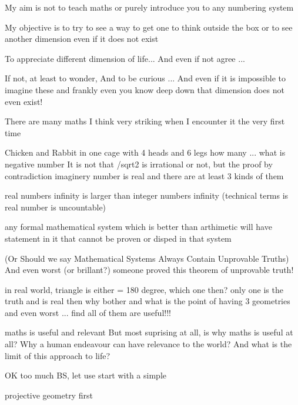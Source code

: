 \documentclass[letterpaper,10pt,english]{jupyterBook}
\begin{document}
\begin{sphinxVerbatim}[commandchars=\\\{\}]
My aim is not to \PYGZdq{}teach\PYGZdq{} maths 
    or purely introduce you to any numbering system
    
My objective is to 
    try to see a way to get one to think outside the box
    or to see another dimension even if it does not exist

To appreciate different dimension of life...
       And even if not agree ... 

If not, at least to wonder, 
       And to be curious ...
            And even if it is impossible to imagine these
                and frankly even you know deep down that dimension does not even exist!
\end{sphinxVerbatim}

\begin{sphinxVerbatim}[commandchars=\\\{\}]
There are many maths I think very striking when I encounter it the very first time

\PYGZhy{} Chicken and Rabbit in one cage with 4 heads and 6 legs how many ...
\PYGZhy{} what is negative number
\PYGZhy{} It is not that /sqrt\PYGZob{}2\PYGZcb{} is irrational or not, but the proof by contradiction
\PYGZhy{} imaginery number is real and there are at least 3 kinds of them

\PYGZhy{}\PYGZhy{}\PYGZhy{}\PYGZgt{} real number\PYGZsq{}s infinity is larger than integer number\PYGZsq{}s infinity
        (technical terms is real number is uncountable)

\PYGZhy{}\PYGZhy{}\PYGZhy{}\PYGZgt{} any formal mathematical system which is better than arthimetic will 
        have statement in it that cannot be proven or disped in that system
        
        (Or Should we say Mathematical Systems Always Contain Unprovable Truths)
        And even worst (or brillant?) someone proved this theorem of unprovable truth!
    
\PYGZhy{}\PYGZhy{}\PYGZhy{}\PYGZgt{} in real world, triangle is either \PYGZgt{}=\PYGZlt{} 180 degree, which one then?
        only one is the truth and is real
        then why bother and what is the point of having 3 geometries
        and even worst ... find all of them are useful!!!
    
\PYGZhy{}\PYGZhy{}\PYGZgt{} maths is useful and relevant 
        But most suprising at all, is why maths is useful at all?
        Why a human endeavour can have relevance to the world?
        And what is the limit of this approach to life?

OK too much BS, let use start with a simple 

\PYGZhy{}\PYGZhy{}\PYGZgt{} projective geometry first
\end{sphinxVerbatim}
\end{document}
